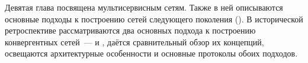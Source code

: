 Девятая глава посвящена мультисервисным сетям. Также в ней описываются
основные подходы к построению сетей следующего поколения
(). В исторической ретроспективе рассматриваются два
основных подхода к построению конвергентных сетей~---
 и , даётся сравнительный обзор их
концепций, освещаются архитектурные особенности и основные протоколы
обоих подходов.




